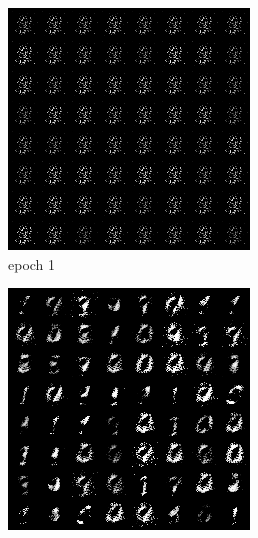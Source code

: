 \documentclass[a4paper]{article}
\theoremstyle{definition}
\newenvironment{soln}{
	\leavevmode\color{blue}\ignorespaces
}{}
\begin{document}
\begin{enumerate} [label=(\alph*)]
\begin{soln}
			\begin{figure}[H]
				\centering
				\begin{subfigure}[b]{0.3\textwidth}
					\centering
					\includegraphics[width=\textwidth]{outputs/q2/gen_img1.png}
					\caption{epoch 1}
				\end{subfigure}
				\hfill
				\begin{subfigure}[b]{0.3\textwidth}
					\centering
					\includegraphics[width=\textwidth]{outputs/q2/gen_img50.png}

\end{subfigure}
\end{figure}
\end{soln}
\end{enumerate}
\end{document}
